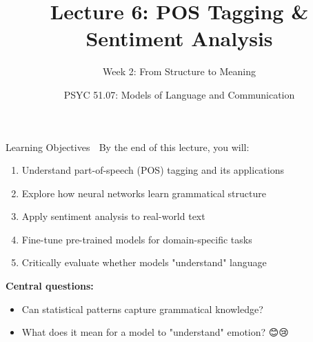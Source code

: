 \documentclass[aspectratio=169]{beamer}
\title{Lecture 6: POS Tagging \& Sentiment Analysis}
\subtitle{Week 2: From Structure to Meaning}
\author{PSYC 51.07: Models of Language and Communication}
\date{}
\begin{document}
\begin{frame}
    \titlepage
\end{frame}

\begin{frame}[shrink=10]{Learning Objectives 🎯}
    By the end of this lecture, you will:

    \begin{enumerate}\setlength{\itemsep}{0pt}
        \item Understand part-of-speech (POS) tagging and its applications
        \item Explore how neural networks learn grammatical structure
        \item Apply sentiment analysis to real-world text
        \item Fine-tune pre-trained models for domain-specific tasks
        \item Critically evaluate whether models "understand" language
    \end{enumerate}

    \vspace{1em}
    \textbf{Central questions:}
    \begin{itemize}\setlength{\itemsep}{0pt}
        \item Can statistical patterns capture grammatical knowledge? 🤔
        \item What does it mean for a model to "understand" emotion? 😊😢
    \end{itemize}
\end{frame}
\end{document}

